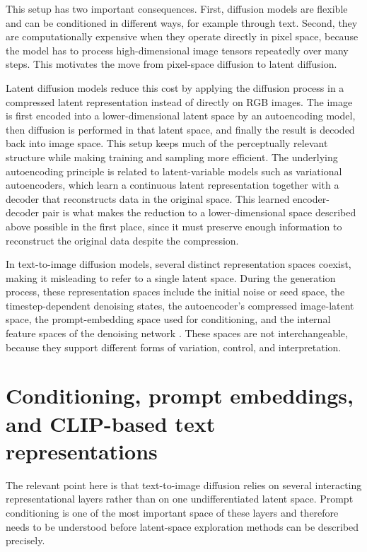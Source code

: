 This setup has two important consequences. First, diffusion models are flexible and can be conditioned in different ways, for example through text. Second, they are computationally expensive when they operate directly in pixel space, because the model has to process high-dimensional image tensors repeatedly over many steps. This motivates the move from pixel-space diffusion to latent diffusion. \cite{rombach2022latent}

Latent diffusion models reduce this cost by applying the diffusion process in a compressed latent representation instead of directly on RGB images. The image is first encoded into a lower-dimensional latent space by an autoencoding model, then diffusion is performed in that latent space, and finally the result is decoded back into image space. This setup keeps much of the perceptually relevant structure while making training and sampling more efficient. The underlying autoencoding principle is related to latent-variable models such as variational autoencoders, which learn a continuous latent representation together with a decoder that reconstructs data in the original space. This learned encoder-decoder pair is what makes the reduction to a lower-dimensional space described above possible in the first place, since it must preserve enough information to reconstruct the original data despite the compression. \cite{rombach2022latent,kingma2014vae}

In text-to-image diffusion models, several distinct representation spaces coexist, making it misleading to refer to a single latent space. During the generation process, these representation spaces include the initial noise or seed space, the timestep-dependent denoising states, the autoencoder's compressed image-latent space, the prompt-embedding space used for conditioning, and the internal feature spaces of the denoising network \cite{rombach2022latent,samuel2023normguided,park2023riemannian,kwon2023semantic}. These spaces are not interchangeable, because they support different forms of variation, control, and interpretation.

\section{Conditioning, prompt embeddings, and CLIP-based text representations}\label{sec:2.2}

The relevant point here is that text-to-image diffusion relies on several interacting representational layers rather than on one undifferentiated latent space. Prompt conditioning is one of the most important space of these layers and therefore needs to be understood before latent-space exploration methods can be described precisely.

